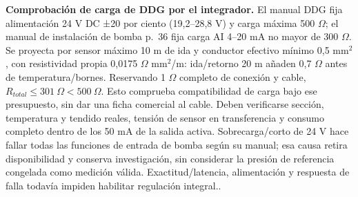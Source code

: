 \textbf{Comprobación de carga de DDG por el integrador.} El manual DDG fija alimentación 24 V DC ±20 por ciento (19,2--28,8 V) y carga máxima 500 $\Omega$; el manual de instalación de bomba p.~36 fija carga AI 4--20 mA no mayor de 300 $\Omega$. Se proyecta por sensor máximo 10 m de ida y conductor efectivo mínimo 0,5 mm$^2$, con resistividad propia 0,0175 $\Omega$ mm$^2$/m: ida/retorno 20 m añaden 0,7 $\Omega$ antes de temperatura/bornes. Reservando 1 $\Omega$ completo de conexión y cable, $R_{total}\le301~\Omega<500~\Omega$. Esto comprueba compatibilidad de carga bajo ese presupuesto, sin dar una ficha comercial al cable. Deben verificarse sección, temperatura y tendido reales, tensión de sensor en transferencia y consumo completo dentro de los 50 mA de la salida activa. Sobrecarga/corto de 24 V hace fallar todas las funciones de entrada de bomba según su manual; esa causa retira disponibilidad y conserva investigación, sin considerar la presión de referencia congelada como medición válida. Exactitud/latencia, alimentación y respuesta de falla todavía impiden habilitar regulación integral.\parencites[p.~19]{lote37-ddg-manual}[p.~36]{lote37-wilo-instalacion}.
